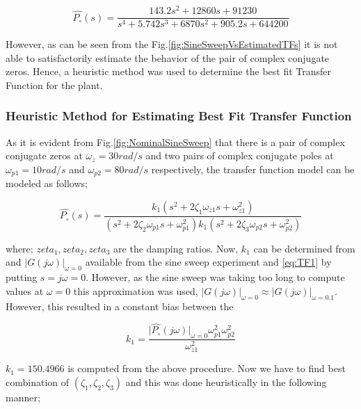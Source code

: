 \documentclass[11pt,usenames]{article}
\begin{document}
\begin{equation} 
\hat{P_{\circ}}(s)=\dfrac{143.2s^{2}+12860s+91230}{s^{4}+5.742s^{3}+6870s^{2}+905.2s+644200}
\label{eq:Ginv}
\end{equation}

However, as can be seen from the Fig.\ref{fig:SineSweepVsEstimatedTFs} it is not able to satisfactorily estimate the behavior of the pair of complex conjugate zeros. Hence, a heuristic method was used to determine the best fit Transfer Function for the plant.

\subsubsection{Heuristic Method for Estimating Best Fit Transfer Function}
As it is evident from Fig.\ref{fig:NominalSineSweep} that there is a pair of complex conjugate zeros at $\omega_z = 30 rad/s$ and two pairs of complex conjugate poles at $\omega_{p1} = 10 rad/s$ and $\omega_{p2} = 80 rad/s$ respectively, the transfer function model can be modeled as follows;

\begin{equation} 
\hat{P_{\circ}}(s)=\dfrac{k_{1}(s^{2}+2\zeta_{1}\omega_{z1}s+\omega_{z1}^{2})}{(s^{2}+2\zeta_{2}\omega_{p1}s+\omega_{p1}^{2})k_{1}(s^{2}+2\zeta_{3}\omega_{p2}s+\omega_{p2}^{2})}
\label{eq:TF1}
\end{equation}

where; $ zeta_{1}, zeta_{2}, zeta_{3}$ are the damping ratios. Now, $k_{1}$ can be determined from  and $\lvert G(j\omega) \rvert _{\omega=0}$ available from the sine sweep experiment and \eqref{eq:TF1} by putting $ s=j\omega=0 $. However, as the sine sweep was taking too long to compute values at $ \omega=0 $ this approximation was used, $ \lvert G(j\omega) \rvert _{\omega=0} \approx \lvert G(j\omega) \rvert _{\omega=0.1}$. However, this resulted in a constant bias between the  

\begin{equation} 
k_{1}=\dfrac{\lvert \hat{P_{\circ}}(j\omega) \rvert _{\omega=0} \omega_{p1}^{2} \omega_{p2}^{2} }{\omega_{z1}^{2}}
\label{eq:TF2}
\end{equation}

$k_{1}=150.4966$ is computed from the above procedure. Now we have to find best combination of   $ (\zeta_{1}, \zeta_{2}, \zeta_{3}) $ and this was done heuristically in the following manner;
\end{document}
